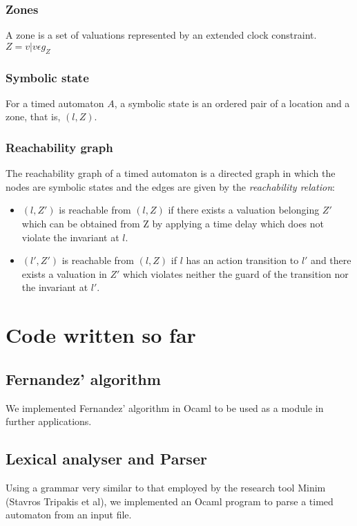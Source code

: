 \documentclass{article}
\begin{document}
\subsubsection{Zones}
A zone is a set of valuations represented by an
extended clock constraint.\\
$Z = {v|v \epsilon g_Z}$
\subsubsection{Symbolic state}
For a timed automaton $A$, a symbolic
state is an ordered pair of a location and a zone, that is, $(l,
Z)$.
\subsubsection{Reachability graph}
The reachability graph of a timed
automaton is a directed graph in which the nodes are symbolic states
and the edges are given by the \emph{reachability relation}:
\begin{itemize}
\item $(l,Z')$ is reachable from $(l,Z)$ if there exists a
  valuation belonging $Z'$ which can be obtained
  from Z by applying a time delay which does not violate the
  invariant at $l$.

\item $(l', Z')$ is reachable from $(l, Z)$ if $l$ has an action
  transition to $l'$ and there exists a valuation in $Z'$ which
  violates neither the guard of the
  transition nor the invariant at $l'$.
\end{itemize}

\section{Code written so far}

\subsection{Fernandez' algorithm}

We implemented Fernandez' algorithm in Ocaml to be used as a module in
further applications.

\subsection{Lexical analyser and Parser}

Using a grammar very similar to that employed by the research tool Minim (Stavros
Tripakis et al), we implemented an Ocaml program to parse a timed
automaton from an input file.
\end{document}
